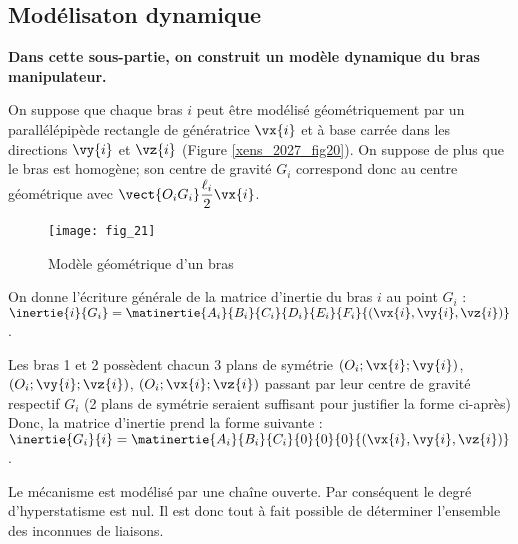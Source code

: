  \subsection{Modélisaton dynamique}
\textbf{Dans cette sous-partie, on construit un modèle dynamique du bras manipulateur.}

On suppose que chaque bras $i$ peut être modélisé géométriquement par un parallélépipède
 rectangle de génératrice $\vx{i}$ et à base carrée dans les directions $\vy{i}$ et $\vz{i}$ (Figure \ref{xens_2027_fig20}). On
 suppose de plus que le bras est homogène; son centre de gravité $G_i$ correspond donc au centre
 géométrique avec $\vect{O_iG_i} \dfrac{\ell_i}{2} \vx{i}$.
 

\begin{figure}[!h]
\centering
\texttt{[image: fig\_21]}
\caption{Modèle géométrique d'un bras \label{xens_2027_fig21}}
\end{figure}



On donne l'écriture générale de la matrice d'inertie du bras $i$ au point $G_i$ : 
$\inertie{i}{G_i} = \matinertie{A_i}{B_i}{C_i}{D_i}{E_i}{F_i}{\left( \vx{i},\vy{i},\vz{i}\right)}$.



  \ifprof
 \begin{corrige}
 Les bras 1 et 2 possèdent chacun 3 plans de symétrie $\left(O_i;\vx{i}; \vy{i}\right)$, $\left(O_i;\vy{i}; \vz{i}\right)$, $\left(O_i;\vx{i}; \vz{i}\right)$ passant par leur centre de gravité respectif $G_i$ (2 plans de symétrie seraient suffisant pour justifier la forme ci-après)
Donc, la matrice d’inertie prend la forme suivante : 
$\inertie{G_i}{i} =\matinertie{A_i}{B_i}{C_i}{0}{0}{0}{\left(\vx{i},\vy{i},\vz{i}\right)}$.

 \end{corrige}
 \else
 \fi
 
 \ifprof
 \begin{corrige}
 Le mécanisme est modélisé par une chaîne ouverte. Par conséquent le degré d’hyperstatisme est nul. Il est donc tout à fait possible de déterminer l’ensemble des inconnues de liaisons.
 \end{corrige}
 \else
 \fi

